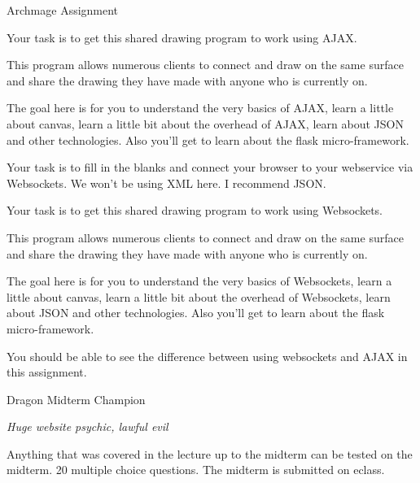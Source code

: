 \documentclass[../CMPUT-404-Notes.tex]{subfiles}
\begin{document}
\begin{monsterbox}{Archmage Assignment}
\begin{monsteraction}
        Your task is to get this shared drawing program to work using AJAX.

        This program allows numerous clients to connect and draw on the same surface and share the drawing they have made with anyone who is currently on.

        The goal here is for you to understand the very basics of AJAX, learn a little about canvas, learn a little bit about the overhead of AJAX, learn about JSON and other technologies. Also you’ll get to learn about the flask micro-framework.
    \end{monsteraction}
    \begin{monsteraction}
        Your task is to fill in the blanks and connect your browser to your webservice via Websockets. We won’t be using XML here. I recommend JSON.

        Your task is to get this shared drawing program to work using Websockets.

        This program allows numerous clients to connect and draw on the same surface and share the drawing they have made with anyone who is currently on.

        The goal here is for you to understand the very basics of Websockets, learn a little about canvas, learn a little bit about the overhead of Websockets, learn about JSON and other technologies. Also you’ll get to learn about the flask micro-framework.

        You should be able to see the difference between using websockets and AJAX in this assignment.
    \end{monsteraction}
    
\end{monsterbox}

\begin{monsterbox}{Dragon Midterm Champion}
    \begin{hangingpar}
        \textit{Huge website psychic, lawful evil}
    \end{hangingpar}
    \dndline
    \basics[armorclass = 20, hitpoints = 20, speed = {50 minutes}]
    \dndline
    \stats[
        STR = \stat{23},
        DEX = \stat{12},
        CON = \stat{21},
        INT = \stat{18},
        WIS = \stat{15},
        CHA = \stat{17},
    ]
    \dndline
    \details[
        languages = {Python, JavaScript, HTML, CSS},
        challenge = {15},
        senses = {blindsight 60 ft., darkvision 120 ft., passive Perception 22},
    ]
    \dndline
        Anything that was covered in the lecture up to the midterm can be tested on the midterm. 
        20 multiple choice questions. The midterm is submitted on eclass. 
\end{monsterbox}
\end{document}
